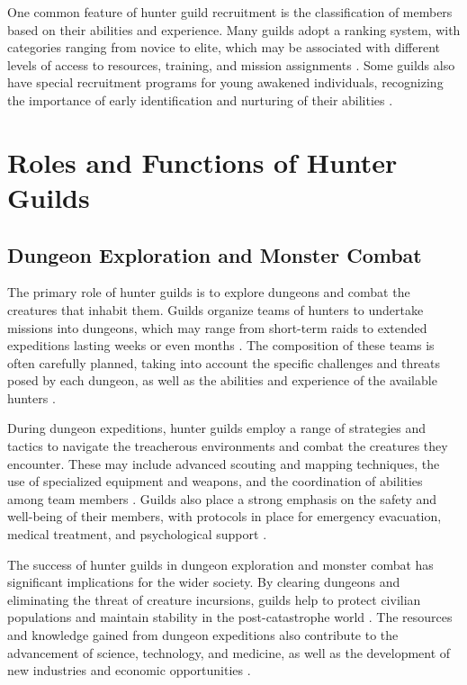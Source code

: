 \documentclass[12pt]{article}
\begin{document}
One common feature of hunter guild recruitment is the classification of members based on their abilities and experience. Many guilds adopt a ranking system, with categories ranging from novice to elite, which may be associated with different levels of access to resources, training, and mission assignments \cite{Nakano2026}. Some guilds also have special recruitment programs for young awakened individuals, recognizing the importance of early identification and nurturing of their abilities \cite{Nguyen2026}.

\section{Roles and Functions of Hunter Guilds}
\subsection{Dungeon Exploration and Monster Combat}
The primary role of hunter guilds is to explore dungeons and combat the creatures that inhabit them. Guilds organize teams of hunters to undertake missions into dungeons, which may range from short-term raids to extended expeditions lasting weeks or even months \cite{Yamamoto2026}. The composition of these teams is often carefully planned, taking into account the specific challenges and threats posed by each dungeon, as well as the abilities and experience of the available hunters \cite{Santos2027}.

During dungeon expeditions, hunter guilds employ a range of strategies and tactics to navigate the treacherous environments and combat the creatures they encounter. These may include advanced scouting and mapping techniques, the use of specialized equipment and weapons, and the coordination of abilities among team members \cite{Nakano2027}. Guilds also place a strong emphasis on the safety and well-being of their members, with protocols in place for emergency evacuation, medical treatment, and psychological support \cite{Lee2027}.

The success of hunter guilds in dungeon exploration and monster combat has significant implications for the wider society. By clearing dungeons and eliminating the threat of creature incursions, guilds help to protect civilian populations and maintain stability in the post-catastrophe world \cite{Ishikawa2026}. The resources and knowledge gained from dungeon expeditions also contribute to the advancement of science, technology, and medicine, as well as the development of new industries and economic opportunities \cite{Krasniqi2027}.
\end{document}
